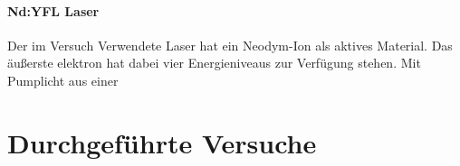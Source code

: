 \paragraph{Nd:YFL Laser}
Der im Versuch Verwendete Laser hat ein Neodym-Ion als aktives Material.
Das äußerste elektron hat dabei vier Energieniveaus zur Verfügung stehen.
Mit Pumplicht aus einer 




\section{Durchgeführte Versuche}


